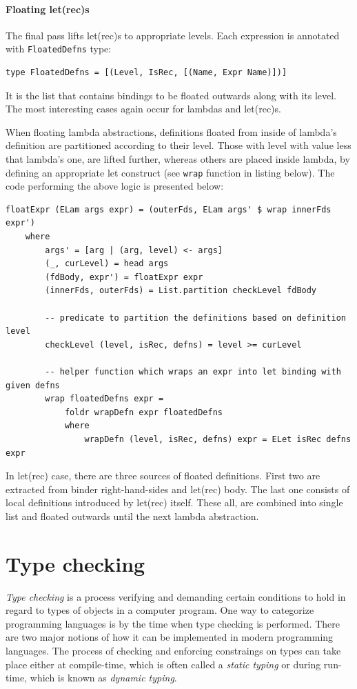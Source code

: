 \documentclass[12pt,a4paper]{report}
\begin{document}
\subsubsection{Floating let(rec)s}
The final pass lifts let(rec)s to appropriate levels. Each expression is
annotated with \texttt{FloatedDefns} type:

\vspace*{0.2in}
\begin{lstlisting}[style=haskell]
type FloatedDefns = [(Level, IsRec, [(Name, Expr Name)])]
\end{lstlisting}

It is the list that contains bindings to be floated outwards along with its
level. The most interesting cases again occur for lambdas and let(rec)s.

When floating lambda abstractions, definitions floated from inside of lambda's
definition are partitioned according to their level. Those with level with
value less that lambda's one, are lifted further, whereas others are placed
inside lambda, by defining an appropriate let construct (see \texttt{wrap}
function in listing below). The code performing the above logic is presented
below:

\vspace*{0.2in}
\begin{lstlisting}[style=haskell]
floatExpr (ELam args expr) = (outerFds, ELam args' $ wrap innerFds expr')
    where
        args' = [arg | (arg, level) <- args]
        (_, curLevel) = head args
        (fdBody, expr') = floatExpr expr
        (innerFds, outerFds) = List.partition checkLevel fdBody

        -- predicate to partition the definitions based on definition level
        checkLevel (level, isRec, defns) = level >= curLevel

        -- helper function which wraps an expr into let binding with given defns
        wrap floatedDefns expr =
            foldr wrapDefn expr floatedDefns
            where
                wrapDefn (level, isRec, defns) expr = ELet isRec defns expr
\end{lstlisting}

In let(rec) case, there are three sources of floated definitions. First two are
extracted from binder right-hand-sides and let(rec) body. The last one consists
of local definitions introduced by let(rec) itself. These all, are combined into
single list and floated outwards until the next lambda abstraction.

\chapter{Type checking}
\textit{Type checking} is a process verifying and demanding certain conditions
to hold in regard to types of objects in a computer program. One way to
categorize programming languages is by the time when type checking is
performed. There are two major notions of how it can be implemented in modern
programming languages. The process of checking and enforcing constraings on
types can take place either at compile-time, which is often called a
\textit{static typing} or during run-time, which is known as \textit{dynamic
typing}.
\end{document}

